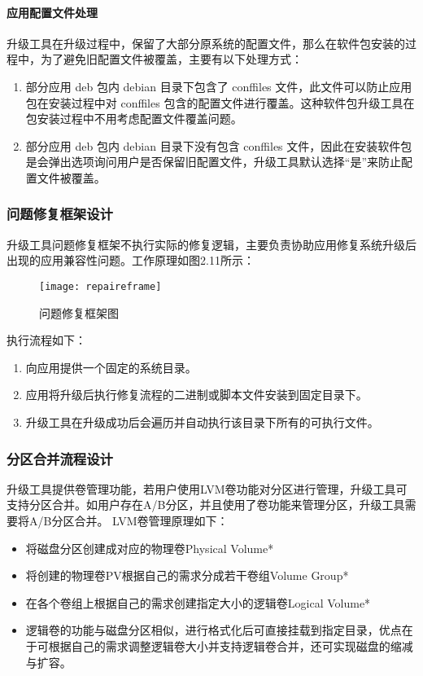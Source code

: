 \documentclass{utart}
\begin{document}
\paragraph{应用配置文件处理}
升级工具在升级过程中，保留了大部分原系统的配置文件，那么在软件包安装的过程中，为了避免旧配置文件被覆盖，主要有以下处理方式：
\begin{enumerate}
    \item 部分应用 deb 包内 debian 目录下包含了 conffiles 文件，此文件可以防止应用包在安装过程中对 conffiles 包含的配置文件进行覆盖。这种软件包升级工具在包安装过程中不用考虑配置文件覆盖问题。
    \item 部分应用 deb 包内 debian 目录下没有包含 conffiles 文件，因此在安装软件包是会弹出选项询问用户是否保留旧配置文件，升级工具默认选择“是”来防止配置文件被覆盖。
\end{enumerate}

\subsubsection{问题修复框架设计}
升级工具问题修复框架不执行实际的修复逻辑，主要负责协助应用修复系统升级后出现的应用兼容性问题。工作原理如图2.11所示：

\begin{figure}[H]
    \centering
    \texttt{[image: repaireframe]}
    \caption{问题修复框架图}
    \label{fig:repaire}
\end{figure}

执行流程如下：
\begin{enumerate}
    \item 向应用提供一个固定的系统目录。
    \item 应用将升级后执行修复流程的二进制或脚本文件安装到固定目录下。
    \item 升级工具在升级成功后会遍历并自动执行该目录下所有的可执行文件。
\end{enumerate}

\subsubsection{分区合并流程设计}
升级工具提供卷管理功能，若用户使用LVM卷功能对分区进行管理，升级工具可支持分区合并。如用户存在A/B分区，并且使用了卷功能来管理分区，升级工具需要将A/B分区合并。
LVM卷管理原理如下：
\begin{itemize}
    \item 将磁盘分区创建成对应的物理卷Physical Volume*
    \item 将创建的物理卷PV根据自己的需求分成若干卷组Volume Group*
    \item 在各个卷组上根据自己的需求创建指定大小的逻辑卷Logical Volume*
    \item 逻辑卷的功能与磁盘分区相似，进行格式化后可直接挂载到指定目录，优点在于可根据自己的需求调整逻辑卷大小并支持逻辑卷合并，还可实现磁盘的缩减与扩容。
\end{itemize}
\end{document}
